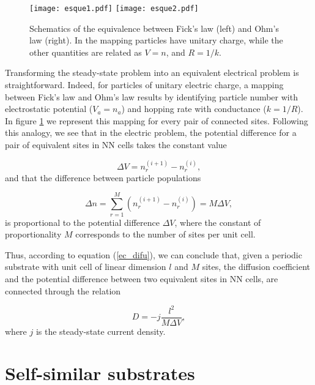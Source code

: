\documentclass[12pt]{iopart}
\begin{document}
\begin{figure}[!ht]
	\begin{center}
    \texttt{[image: esque1.pdf]}
		\hspace*{3cm}	
	 \texttt{[image: esque2.pdf]}	  
 \end{center}
    \caption{Schematics of the equivalence between Fick's law (left) and 
    Ohm's law (right). In the mapping particles have unitary charge,
    while the other quantities are related as $V=n$, and $R=1/k$.
	}
\label{esque_equi}
\end{figure}
Transforming the steady-state problem into an equivalent electrical problem is straightforward.
Indeed, for particles of unitary electric charge, a mapping between
Fick's law and Ohm's law  
results by identifying particle number
with electrostatic potential ($V_a= n_a$) and hopping rate 
with conductance ($k= 1/R$). In figure \ref{esque_equi} we represent
this mapping for every pair of connected sites. 
Following this analogy, we see that in the electric problem, the potential
difference for a pair of equivalent sites in NN cells takes
the constant value

\begin{equation}
    \Delta V= n_r^{(i+1)}-n_r^{(i)},
\end{equation}
and that the difference between particle populations 

\begin{equation}
    \Delta n= \sum_{r=1}^M (n_r^{(i+1)}-n_r^{(i)})=M \Delta V,
\end{equation}
is proportional to the potential difference $\Delta V$, where the
constant of proportionality $M$ corresponds to the number of sites 
per unit cell.

Thus, according to equation (\ref{ec_difu}), we can conclude that, given a periodic substrate
with unit cell of linear dimension $l$ and $M$ sites, the diffusion
coefficient and the potential difference between two  equivalent sites
in NN cells, are connected through the relation

\begin{equation}
  D = -j \frac{l^2}{M\Delta V},
    \label{D_V}
\end{equation}
where $j$ is the steady-state current density.

\section{Self-similar substrates}\label{sec:fractal}
\end{document}
